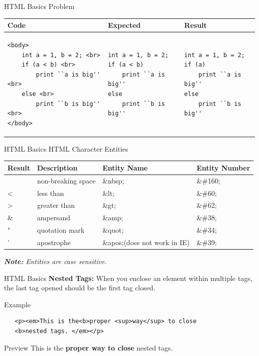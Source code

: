 \documentclass[14pt]{beamer}
\begin{document}
\begin{frame}[fragile]{HTML Basics}
 Problem
 
 \vspace{1pc}
 \begin{tabular}{|p{3cm} | p{3cm} | p{3cm} |}
  \hline
  \textbf{Code} & \textbf{Expected} & \textbf{Result} \\ \hline
\begin{lstlisting}
<body>
    int a = 1, b = 2; <br>
    if (a < b) <br>
        print ``a is big'' <br>
    else <br>
        print ``b is big'' <br>
</body>
\end{lstlisting}
  & 
\begin{lstlisting}
int a = 1, b = 2;
if (a < b)
    print ``a is big''
else
    print ``b is big''
\end{lstlisting}
  &
\begin{lstlisting}
int a = 1, b = 2;
if (a)
    print ``a is big''
else
    print ``b is big''
\end{lstlisting}
  \\ \hline

 \end{tabular}
\end{frame}

\begin{frame}{HTML Basics}
 HTML Character Entities
 
 \vspace{1pc}
 \small
 \begin{tabular}{|p{1.5cm} | p{3cm} | p{2cm} | p{2cm} |}
  \hline
  \textbf{Result} & \textbf{Description} & \textbf{Entity Name} & \textbf{Entity Number} \\ \hline
  & non-breaking space & \&nbsp; & \&\#160; \\ \hline
  < & less than & \&lt; & \&\#60; \\ \hline
  > & greater than & \&gt; & \&\#62;  \\ \hline
  \& & ampersand & \&amp; & \&\#38; \\ \hline
  " & quotation mark & \&quot; & \&\#34;  \\ \hline
  ' & apostrophe & \&apos;\newline (does not work in IE) & \&\#39; \\ \hline
 \end{tabular}
 
\emph{\textbf{Note:} Entities are case sensitive.}
\end{frame}

\begin{frame}[fragile]{HTML Basics}
 \textbf{Nested Tags:} When you enclose an element within multiple tags, the last tag opened should be the first tag closed.
 \begin{block}{Example}
  \begin{lstlisting}
   <p><em>This is the<b>proper <sup>way</sup> to close 
   <b>nested tags. </em></p>
  \end{lstlisting}
 \end{block}
\begin{block}{Preview}
This is the \textbf{proper way to close} nested tags.
\end{block}
\end{frame}
\end{document}
